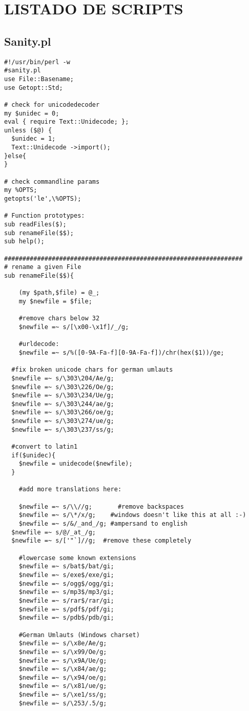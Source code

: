 \section{LISTADO DE SCRIPTS}
\label{scripts}

\subsection{Sanity.pl}
\label{script-sanity}
\begin{lstlisting}[style=archivo]
#!/usr/bin/perl -w
#sanity.pl
use File::Basename;
use Getopt::Std;

# check for unicodedecoder
my $unidec = 0;
eval { require Text::Unidecode; };
unless ($@) {
  $unidec = 1;
  Text::Unidecode ->import();
}else{
}

# check commandline params
my %OPTS;
getopts('le',\%OPTS);

# Function prototypes:
sub readFiles($);
sub renameFile($$);
sub help();

#################################################################
# rename a given File
sub renameFile($$){

	(my $path,$file) = @_;
	my $newfile = $file;

	#remove chars below 32
	$newfile =~ s/[\x00-\x1f]/_/g;

	#urldecode:
	$newfile =~ s/%([0-9A-Fa-f][0-9A-Fa-f])/chr(hex($1))/ge;

  #fix broken unicode chars for german umlauts
  $newfile =~ s/\303\204/Ae/g;
  $newfile =~ s/\303\226/Oe/g;
  $newfile =~ s/\303\234/Ue/g;
  $newfile =~ s/\303\244/ae/g;
  $newfile =~ s/\303\266/oe/g;
  $newfile =~ s/\303\274/ue/g;
  $newfile =~ s/\303\237/ss/g;

  #convert to latin1
  if($unidec){
    $newfile = unidecode($newfile);
  }

	#add more translations here:
	
	$newfile =~ s/\\//g;	   #remove backspaces
	$newfile =~ s/\*/x/g;    #windows doesn't like this at all :-)
	$newfile =~ s/&/_and_/g; #ampersand to english
  $newfile =~ s/@/_at_/g;
  $newfile =~ s/['"`]//g;  #remove these completely

	#lowercase some known extensions	
	$newfile =~ s/bat$/bat/gi;
	$newfile =~ s/exe$/exe/gi;
	$newfile =~ s/ogg$/ogg/gi;
	$newfile =~ s/mp3$/mp3/gi;
	$newfile =~ s/rar$/rar/gi;
	$newfile =~ s/pdf$/pdf/gi;
	$newfile =~ s/pdb$/pdb/gi;

	#German Umlauts (Windows charset)
	$newfile =~ s/\x8e/Ae/g;
	$newfile =~ s/\x99/Oe/g;
	$newfile =~ s/\x9A/Ue/g;
	$newfile =~ s/\x84/ae/g;
	$newfile =~ s/\x94/oe/g;
	$newfile =~ s/\x81/ue/g;
	$newfile =~ s/\xe1/ss/g;
	$newfile =~ s/\253/.5/g;


\end{lstlisting}
